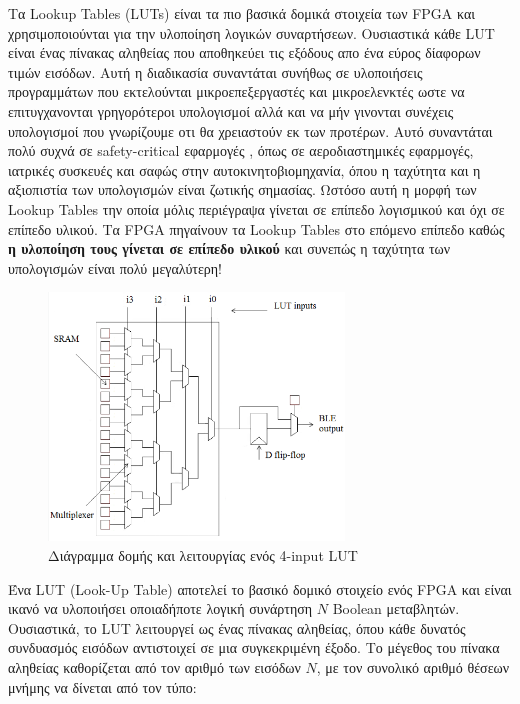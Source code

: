 Τα Lookup Tables (LUTs) είναι τα πιο βασικά δομικά στοιχεία των FPGA και χρησιμοποιούνται για την υλοποίηση λογικών συναρτήσεων.
Ουσιαστικά κάθε LUT είναι ένας πίνακας αληθείας που αποθηκεύει τις εξόδους απο ένα εύρος δίαφορων τιμών εισόδων.
Αυτή η διαδικασία συναντάται συνήθως σε υλοποιήσεις προγραμμάτων που εκτελούνται μικροεπεξεργαστές και μικροελενκτές ωστε να επιτυγχανονται γρηγορότεροι υπολογισμοί
αλλά και να μήν γινονται συνέχεις υπολογισμοί που γνωρίζουμε οτι θα χρειαστούν εκ των προτέρων.
Αυτό συναντάται πολύ συχνά σε safety-critical εφαρμογές , όπως σε αεροδιαστημικές εφαρμογές, ιατρικές συσκευές και σαφώς στην αυτοκινητοβιομηχανία,
όπου η ταχύτητα και η αξιοπιστία των υπολογισμών είναι ζωτικής σημασίας.
Ωστόσο αυτή η μορφή των Lookup Tables την οποία μόλις περιέγραψα γίνεται σε επίπεδο λογισμικού και όχι σε επίπεδο υλικού.
Τα FPGA πηγαίνουν τα Lookup Tables στο επόμενο επίπεδο καθώς \textbf{η υλοποίηση τους γίνεται σε επίπεδο υλικού} και συνεπώς η ταχύτητα των υπολογισμών είναι πολύ μεγαλύτερη!

\begin{figure}[h!]
  \centering
  \includegraphics[width=0.7\textwidth]{figures/chapter3/lut_diagram.png}
  \caption{Διάγραμμα δομής και λειτουργίας ενός 4-input LUT}
  \label{fig:lut_diagram}
\end{figure}

Ένα LUT (Look-Up Table) αποτελεί το βασικό δομικό στοιχείο ενός FPGA και είναι ικανό να υλοποιήσει οποιαδήποτε λογική συνάρτηση \(N\) Boolean μεταβλητών. Ουσιαστικά, το LUT λειτουργεί ως ένας πίνακας αληθείας, όπου κάθε δυνατός συνδυασμός εισόδων αντιστοιχεί σε μια συγκεκριμένη έξοδο. Το μέγεθος του πίνακα αληθείας καθορίζεται από τον αριθμό των εισόδων \(N\), με τον συνολικό αριθμό θέσεων μνήμης να δίνεται από τον τύπο:

